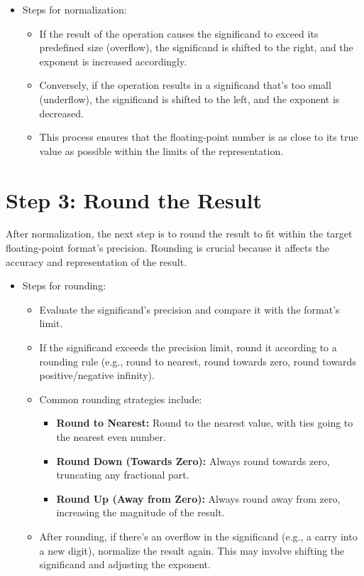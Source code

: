 \documentclass[12pt,openany, tikz,border=10pt]{book}
\begin{document}
    \begin{itemize}
        \item[] Steps for normalization:
        \begin{itemize}
            \item If the result of the operation causes the significand to exceed its predefined size (overflow), the significand is shifted to the right, and the exponent is increased accordingly.
            \item Conversely, if the operation results in a significand that's too small (underflow), the significand is shifted to the left, and the exponent is decreased.
            \item This process ensures that the floating-point number is as close to its true value as possible within the limits of the representation.
        \end{itemize}
    \end{itemize}
    \section*{Step 3: Round the Result}

    After normalization, the next step is to round the result to fit within the target floating-point format's precision. Rounding is crucial because it affects the accuracy and representation of the result.
    
    \begin{itemize}
        \item[] Steps for rounding:
        \begin{itemize}
            \item Evaluate the significand's precision and compare it with the format's limit.
            \item If the significand exceeds the precision limit, round it according to a rounding rule (e.g., round to nearest, round towards zero, round towards positive/negative infinity).
            \item Common rounding strategies include:
            \begin{itemize}
                \item \textbf{Round to Nearest:} Round to the nearest value, with ties going to the nearest even number.
                \item \textbf{Round Down (Towards Zero):} Always round towards zero, truncating any fractional part.
                \item \textbf{Round Up (Away from Zero):} Always round away from zero, increasing the magnitude of the result.
            \end{itemize}
            \item After rounding, if there's an overflow in the significand (e.g., a carry into a new digit), normalize the result again. This may involve shifting the significand and adjusting the exponent.
        \end{itemize}
    \end{itemize}
    
\end{document}

